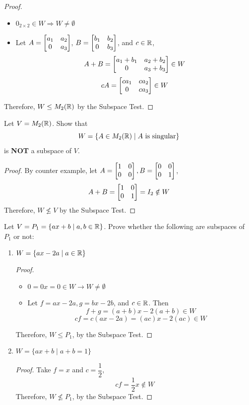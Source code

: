 \begin{proof}
\leavevmode
\begin{itemize}
    \item $0_{2 \times 2} \in W \Longrightarrow W \neq \emptyset$
    \item Let $A = \begin{bmatrix} a_1 & a_2 \\ 0 & a_3 \end{bmatrix}$, $B = \begin{bmatrix} b_1 & b_2 \\ 0 & b_3 \end{bmatrix}$, and $c \in \mathbb{R}$,
    $$A + B = \begin{bmatrix} a_1 + b_1 & a_2 + b_2 \\ 0 & a_3 + b_3 \end{bmatrix} \in W$$
    $$cA = \begin{bmatrix} ca_1 & ca_2 \\ 0 & ca_3 \end{bmatrix} \in W$$
\end{itemize}
Therefore, $W \leq M_2(\mathbb{R})$ by the Subspace Test.
\end{proof}

\begin{example}
Let $V = M_2(\mathbb{R})$. Show that 
$$W = \{A \in M_2(\mathbb{R}) \mid A \text{ is singular}\}$$
is \textbf{NOT} a subspace of $V$.
\end{example}

\begin{proof}
By counter example, let $A = \begin{bmatrix} 1 & 0 \\ 0 & 0 \end{bmatrix}, B = \begin{bmatrix} 0 & 0 \\ 0 & 1 \end{bmatrix}$,
$$A + B = \begin{bmatrix} 1 & 0 \\ 0 & 1 \end{bmatrix} = I_2 \notin W$$
Therefore, $W \nleq V$ by the Subspace Test.
\end{proof}

\begin{example}
Let $V = P_1 = \{ax + b \mid a, b \in \mathbb{R}\}$. Prove whether the following are subspaces of $P_1$ or not:
\begin{enumerate}[label=\alph*.]
    \item $W = \{ax - 2a \mid a \in \mathbb{R}\}$
    \begin{proof}
        \leavevmode
        \begin{itemize}
            \item $0 = 0x = 0 \in W \rightarrow W \neq \emptyset$
            \item Let $f = ax - 2a, g = bx - 2b$, and $c \in \mathbb{R}$. Then
            $$f + g = (a + b)x - 2(a + b) \in W$$
            $$cf = c(ax - 2a) = (ac)x - 2(ac) \in W$$
        \end{itemize}
    Therefore, $W \leq P_1$, by the Subspace Test.
    \end{proof}
    \item $W = \{ax + b \mid a + b = 1\}$
    \begin{proof}
    \leavevmode
    Take $f = x$ and $c = \dfrac{1}{2}$,
    $$cf = \frac{1}{2}x \notin W$$
    Therefore, $W \nleq P_1$, by the Subspace Test.
    \end{proof}
\end{enumerate}
\end{example}